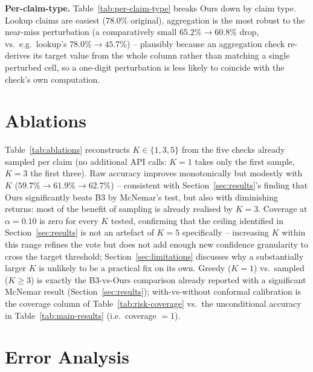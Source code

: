\documentclass[journal]{IEEEtran}
\begin{document}


\textbf{Per-claim-type.} Table~\ref{tab:per-claim-type} breaks Ours down by
claim type. Lookup claims are easiest ($78.0\%$ original), aggregation is
the most robust to the near-miss perturbation (a comparatively small
$65.2\%\to60.8\%$ drop, vs.\ e.g.\ lookup's $78.0\%\to45.7\%$) -- plausibly
because an aggregation check re-derives its target value from the whole
column rather than matching a single perturbed cell, so a one-digit
perturbation is less likely to coincide with the check's own computation.



\section{Ablations}
\label{sec:ablations}



Table~\ref{tab:ablations} reconstructs $K\in\{1,3,5\}$ from the five checks
already sampled per claim (no additional API calls: $K{=}1$ takes only the
first sample, $K{=}3$ the first three). Raw accuracy improves monotonically
but modestly with $K$ ($59.7\%\to61.9\%\to62.7\%$) -- consistent with
Section~\ref{sec:results}'s finding that Ours significantly beats B3 by
McNemar's test, but also with diminishing returns: most of the benefit of
sampling is already realised by $K{=}3$. Coverage at $\alpha=0.10$ is zero
for every $K$ tested, confirming that the ceiling identified in
Section~\ref{sec:results} is not an artefact of $K{=}5$ specifically --
increasing $K$ within this range refines the vote but does not add enough
new confidence granularity to cross the target threshold; Section~\ref{sec:limitations}
discusses why a substantially larger $K$ is unlikely to be a practical fix
on its own. Greedy ($K{=}1$) vs.\ sampled ($K\ge3$) is exactly the B3-vs-Ours
comparison already reported with a significant McNemar result
(Section~\ref{sec:results}); with-vs-without conformal calibration is the
coverage column of Table~\ref{tab:risk-coverage} vs.\ the unconditional
accuracy in Table~\ref{tab:main-results} (i.e.\ coverage $=1$).

\section{Error Analysis}
\label{sec:error-analysis}


\end{document}
